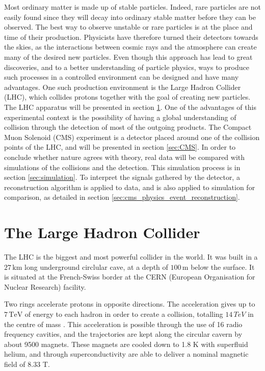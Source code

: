 
Most ordinary matter is made up of stable particles. Indeed, rare particles are not easily found since they will decay into ordinary stable matter before they can be observed. The best way to observe unstable or rare particles is at the place and time of their production. Physicists have therefore turned their detectors towards the skies, as the interactions between cosmic rays and the atmosphere can create many of the desired new particles. Even though this approach has lead to great discoveries, and to a better understanding of particle physics, ways to produce such processes in a controlled environment can be designed and have many advantages. One such production environment is the Large Hadron Collider (LHC), which collides protons together with the goal of creating new particles. The LHC apparatus will be presented in section \ref{sec:LHC}. One of the advantages of this experimental context is the possibility of having a global understanding of collision through the detection of most of the outgoing products. The Compact Muon Solenoid (CMS) experiment is a detector placed around one of the collision points of the LHC, and will be presented in section \ref{sec:CMS}. In order to conclude whether nature agrees with theory, real data will be compared with simulations of the collisions and the detection. This simulation process is in section \ref{sec:simulation}. To interpret the signals gathered by the detector, a reconstruction algorithm is applied to data, and is also applied to simulation for comparison, as detailed in section \ref{sec:cms_physics_event_reconstruction}.

\section{The Large Hadron Collider}
\label{sec:LHC}

The LHC is the biggest and most powerful collider in the world. It was built in a $27\,\mathrm{km}$ long underground circlular cave, at a depth of $100\,\mathrm{m}$ below the surface. It is situated at the French-Swiss border at the CERN (European Organisation for Nuclear Research) facility.

Two rings accelerate protons in opposite directions. The acceleration gives up to $7\,\mathrm{TeV}$ of energy to each hadron in order to create a collision, totalling $14\,TeV$ in the centre of mass \cite{Bruning:782076,Bruning:815187,Benedikt:823808}. This acceleration is possible through the use of 16 radio frequency cavities, and the trajectories are kept along the circular cavern by about 9500 magnets. These magnets are cooled down to 1.8 K with superfluid helium, and through superconductivity are able to deliver a nominal magnetic field of 8.33 T.

